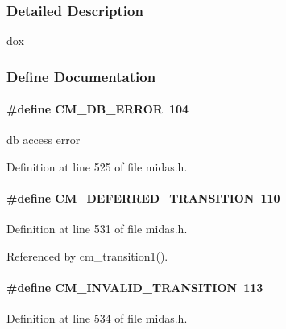 \subsubsection{Detailed Description}
dox 

\subsubsection{Define Documentation}
\paragraph[{CM\_\-DB\_\-ERROR}]{\setlength{\rightskip}{0pt plus 5cm}\#define CM\_\-DB\_\-ERROR~104}\hfill\label{group__err21_gad7158e389b0aa1f99cb40adb80b2bace}
db access error 

Definition at line 525 of file midas.h.
\paragraph[{CM\_\-DEFERRED\_\-TRANSITION}]{\setlength{\rightskip}{0pt plus 5cm}\#define CM\_\-DEFERRED\_\-TRANSITION~110}\hfill\label{group__err21_ga56216c4157257715878749974191b697}

\begin{DoxyItemize}
\item 
\end{DoxyItemize}

Definition at line 531 of file midas.h.

Referenced by cm\_\-transition1().
\paragraph[{CM\_\-INVALID\_\-TRANSITION}]{\setlength{\rightskip}{0pt plus 5cm}\#define CM\_\-INVALID\_\-TRANSITION~113}\hfill\label{group__err21_ga23fd8fcf5d790b87dd9d8a77e263a2d4}

\begin{DoxyItemize}
\item 
\end{DoxyItemize}

Definition at line 534 of file midas.h.

